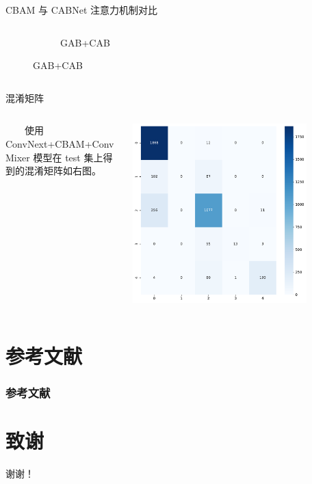 \documentclass[9pt, aspectratio=1610]{beamer}
\begin{document}
\begin{frame}{CBAM 与 CABNet 注意力机制对比}
\begin{columns}
\begin{column}{0.6\textwidth}
\begin{figure}[H]
\begin{subfigure}[b]{0.2\textwidth}
                    \caption{GAB+CAB}
                \end{subfigure}
            \end{figure}
        \end{column}
    \end{columns}

        
    \end{frame}

    \begin{frame}{混淆矩阵}
    \begin{columns}
        \begin{column}{0.5\textwidth}
            　　使用 ConvNext+CBAM+ConvMixer 模型在 test 集上得到的混淆矩阵如右图。
        \end{column}
        \begin{column}{0.5\textwidth}
            \centering
            \includegraphics[width=0.8\textwidth]{confusion_matrix.pdf}
        \end{column}
    \end{columns}

        
    \end{frame}

\section*{参考文献}
\begin{frame}[allowframebreaks]
    \linespread{1.1}
    \frametitle{参考文献}
    \small
    \nocite{*}
    
    
\end{frame}


\section*{致谢}  
\begin{frame}
\centering
\let\thefootnote\relax{}
\let\thefootnote\relax{}
\let\thefootnote\relax\footnotetext{}

\textcolor{myNewColorA}{\Huge{\centerline{谢谢！}}}
\end{frame}
\end{document}
